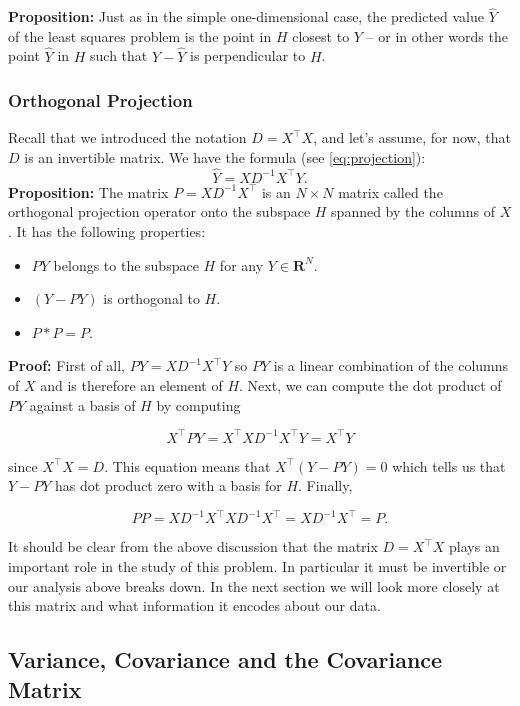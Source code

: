 \documentclass[]{article}
\providecommand{\tightlist}{%
  \setlength{\itemsep}{0pt}\setlength{\parskip}{0pt}}
\begin{document}
\textbf{Proposition:} Just as in the simple one-dimensional case, the
predicted value \(\hat{Y}\) of the least squares problem is the point in
\(H\) closest to \(Y\) -- or in other words the point \(\hat{Y}\) in
\(H\) such that \(Y-\hat{Y}\) is perpendicular to \(H\).

\hypertarget{orthogonal-projection}{%
\subsubsection{Orthogonal Projection}\label{orthogonal-projection}}

Recall that we introduced the notation \(D=X^{\intercal}X\), and let's
assume, for now, that \(D\) is an invertible matrix. We have the formula
(see \cref{eq:projection}): \[
\hat{Y} = XD^{-1}X^{\intercal}Y.
\] \textbf{Proposition:} The matrix \(P=XD^{-1}X^{\intercal}\) is an
\(N\times N\) matrix called the orthogonal projection operator onto the
subspace \(H\) spanned by the columns of \(X\). It has the following
properties:

\begin{itemize}
\tightlist
\item
  \(PY\) belongs to the subspace \(H\) for any \(Y\in\mathbf{R}^{N}\).
\item
  \((Y-PY)\) is orthogonal to \(H\).
\item
  \(P*P = P\).
\end{itemize}

\textbf{Proof:} First of all, \(PY=XD^{-1}X^{\intercal}Y\) so \(PY\) is
a linear combination of the columns of \(X\) and is therefore an element
of \(H\). Next, we can compute the dot product of \(PY\) against a basis
of \(H\) by computing

\[
X^{\intercal}PY = X^{\intercal}XD^{-1}X^{\intercal}Y = X^{\intercal}Y
\]

since \(X^{\intercal}X=D\). This equation means that
\(X^{\intercal}(Y-PY)=0\) which tells us that \(Y-PY\) has dot product
zero with a basis for \(H\). Finally,

\[
PP = XD^{-1}X^{\intercal}XD^{-1}X^{\intercal} = XD^{-1}X^{\intercal}=P.
\]

It should be clear from the above discussion that the matrix
\(D=X^{\intercal}X\) plays an important role in the study of this
problem. In particular it must be invertible or our analysis above
breaks down. In the next section we will look more closely at this
matrix and what information it encodes about our data.

\hypertarget{sec:variance}{%
\subsection{Variance, Covariance and the Covariance
Matrix}\label{sec:variance}}
\end{document}
